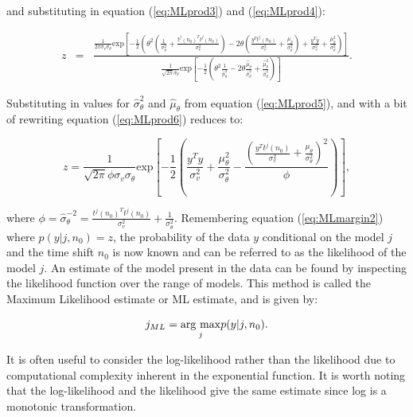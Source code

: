 and substituting in equation (\ref{eq:MLprod3}) and (\ref{eq:MLprod4}):

\begin{eqnarray}\label{eq:MLprod6}
z &=& \frac{\frac{1}{2\pi \sigma_v \sigma_\theta} \textrm{exp}\left[-\frac{1}{2}\left(\theta^2 \left(\frac{1}{\sigma_\theta^2}+\frac{t^j(n_0)^T t^j(n_0)}{\sigma_v^2}\right) - 2\theta\left(\frac{y^T t^j(n_0)}{\sigma_v^2}+\frac{\mu_\theta}{\sigma_\theta^2}\right) + \frac{y^T y}{\sigma_v^2} +\frac{\mu_\theta^2}{\sigma_\theta^2}\right)\right]}{\frac{1}{\sqrt{2 \pi}\hat{\sigma}_\theta}\textrm{exp}\left[-\frac{1}{2}\left(\theta^2\frac{1}{\hat{\sigma}^2_\theta} - 2\theta\frac{\hat{\mu}_\theta}{\hat{\sigma}^2_\theta} + \frac{\hat{\mu}_\theta^2}{\hat{\sigma}^2_\theta}  \right)\right]}.
\end{eqnarray}

Substituting in values for $\hat{\sigma}^2_\theta$ and $\hat{\mu}_\theta$ from equation (\ref{eq:MLprod5}), and with a bit of rewriting equation (\ref{eq:MLprod6}) reduces to:

\begin{equation}\label{eq:MLprod7}
z = \frac{1}{\sqrt{2 \pi}\phi \sigma_v \sigma_\theta}\textrm{exp}\left[-\frac{1}{2}\left(\frac{y^T y}{\sigma^2_v}+\frac{\mu_\theta^2}{\sigma_\theta^2} - \frac{\left(\frac{y^T t^j(n_0)}{\sigma_v^2}+\frac{\mu_\theta}{\sigma_\theta^2}\right)^2}{\phi}\right)\right],
\end{equation}

where $\phi = \hat{\sigma}^{-2}_\theta = \frac{t^j(n_0)^Tt^j(n_0)}{\sigma_v^2} + \frac{1}{\sigma_\theta^2}$. Remembering equation (\ref{eq:MLmargin2}) \linebreak[0]where \linebreak[0]$p(y|j,n_0) = z$, the probability of the data $y$ conditional on the model $j$ and the time shift $n_0$ is now known and can be referred to as the likelihood of the model $j$. An estimate of the model present in the data can be found by inspecting the likelihood function over the range of models. This method is called the Maximum Likelihood estimate or ML estimate, and is given by:

\begin{equation}\label{eq:MLdefinition}
j_{ML} = \underset{j}{\mathrm{arg~max}} p(y|j,n_0).
\end{equation}

It is often useful to consider the log-likelihood rather than the likelihood due to computational complexity inherent in the exponential function. It is worth noting that the log-likelihood and the likelihood give the same estimate since log is a monotonic transformation.

